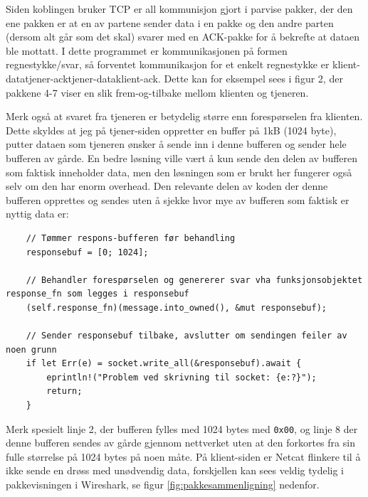 \documentclass{article}
\begin{document}
Siden koblingen bruker TCP er all kommunisjon gjort i parvise pakker, der den ene pakken er at en av partene sender data i en pakke og den andre parten (dersom alt går som det skal) svarer med en ACK-pakke for å bekrefte at dataen ble mottatt. I dette programmet er kommunikasjonen på formen regnestykke/svar, så forventet kommunikasjon for et enkelt regnestykke er klient-data\rightarrow tjener-ack\rightarrow tjener-data\rightarrow klient-ack. Dette kan for eksempel sees i figur 2, der pakkene 4-7 viser en slik frem-og-tilbake mellom klienten og tjeneren.

Merk også at svaret fra tjeneren er betydelig større enn forespørselen fra klienten. Dette skyldes at jeg på tjener-siden oppretter en buffer på 1kB (1024 byte), putter dataen som tjeneren ønsker å sende inn i denne bufferen og sender hele bufferen av gårde. En bedre løsning ville vært å kun sende den delen av bufferen som faktisk inneholder data, men den løsningen som er brukt her fungerer også selv om den har enorm overhead.
Den relevante delen av koden der denne bufferen opprettes og sendes uten å sjekke hvor mye av bufferen som faktisk er nyttig data er:

\begin{lstlisting}
    // Tømmer respons-bufferen før behandling
    responsebuf = [0; 1024];
    
    // Behandler forespørselen og genererer svar vha funksjonsobjektet response_fn som legges i responsebuf
    (self.response_fn)(message.into_owned(), &mut responsebuf);
    
    // Sender responsebuf tilbake, avslutter om sendingen feiler av noen grunn
    if let Err(e) = socket.write_all(&responsebuf).await {
        eprintln!("Problem ved skrivning til socket: {e:?}");
        return;
    }
\end{lstlisting}

Merk spesielt linje 2, der bufferen fylles med 1024 bytes med \texttt{0x00}, og linje 8 der denne bufferen sendes av gårde gjennom nettverket uten at den forkortes fra sin fulle størrelse på 1024 bytes på noen måte. På klient-siden er Netcat flinkere til å ikke sende en drøss med unødvendig data, forskjellen kan sees veldig tydelig i pakkevisningen i Wireshark, se figur \ref{fig:pakkesammenligning} nedenfor.
\end{document}
